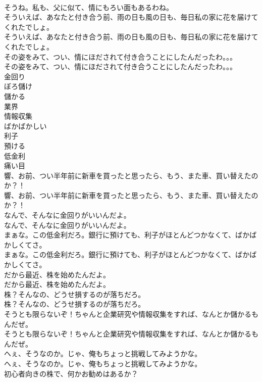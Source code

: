 \documentclass[8pt]{extreport}
\begin{document}
\begin{CJK}{UTF8}{min}
\\	そうね。私も、父に似て、情にもろい面もあるわね。 
\\	そういえば、あなたと付き合う前、雨の日も風の日も、毎日私の家に花を届けてくれたでしょ。	
\\	そういえば、あなたと付き合う前、雨の日も風の日も、毎日私の家に花を届けてくれたでしょ。 
\\	その姿をみて、つい、情にほだされて付き合うことにしたんだったわ。。。	
\\	その姿をみて、つい、情にほだされて付き合うことにしたんだったわ。。。 
\\	金回り
\\	ぼろ儲け
\\	儲かる
\\	業界
\\	情報収集
\\	ばかばかしい
\\	利子
\\	預ける
\\	低金利
\\	痛い目
\\	響、お前、つい半年前に新車を買ったと思ったら、もう、また車、買い替えたのか？！	
\\	響、お前、つい半年前に新車を買ったと思ったら、もう、また車、買い替えたのか？！ 
\\	なんで、そんなに金回りがいいんだよ。	
\\	なんで、そんなに金回りがいいんだよ。 
\\	まぁな。この低金利だろ。銀行に預けても、利子がほとんどつかなくて、ばかばかしくてさ。	
\\	まぁな。この低金利だろ。銀行に預けても、利子がほとんどつかなくて、ばかばかしくてさ。 
\\	だから最近、株を始めたんだよ。	
\\	だから最近、株を始めたんだよ。 
\\	株？そんなの、どうせ損するのが落ちだろ。	
\\	株？そんなの、どうせ損するのが落ちだろ。 
\\	そうとも限らないぞ！ちゃんと企業研究や情報収集をすれば、なんとか儲かるもんだぜ。	
\\	そうとも限らないぞ！ちゃんと企業研究や情報収集をすれば、なんとか儲かるもんだぜ。 
\\	へぇ、そうなのか。じゃ、俺もちょっと挑戦してみようかな。	
\\	へぇ、そうなのか。じゃ、俺もちょっと挑戦してみようかな。 
\\	初心者向きの株で、何かお勧めはあるか？	

\end{CJK}
\end{document}
